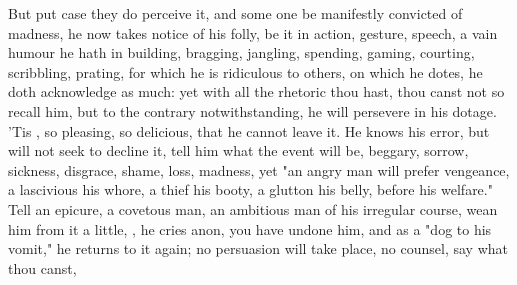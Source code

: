 
But put case they do perceive it, and some one be manifestly convicted of
madness, he now takes notice of his folly, be it in action,
gesture, speech, a vain humour he hath in building, bragging, jangling,
spending, gaming, courting, scribbling, prating, for which he is ridiculous to
others, on which he dotes, he doth acknowledge as much: yet
with all the rhetoric thou hast, thou canst not so recall him, but to the
contrary notwithstanding, he will persevere in his dotage. 'Tis , so pleasing, so delicious, that he
cannot leave it. He knows his error, but will not seek to
decline it, tell him what the event will be, beggary, sorrow, sickness,
disgrace, shame, loss, madness, yet "an angry man will
prefer vengeance, a lascivious his whore, a thief his booty, a glutton his
belly, before his welfare." Tell an epicure, a covetous man, an ambitious man
of his irregular course, wean him from it a little, , he cries anon, you have undone him, and as a "dog
to his vomit," he returns to it again; no persuasion will take place, no
counsel, say what thou canst,


